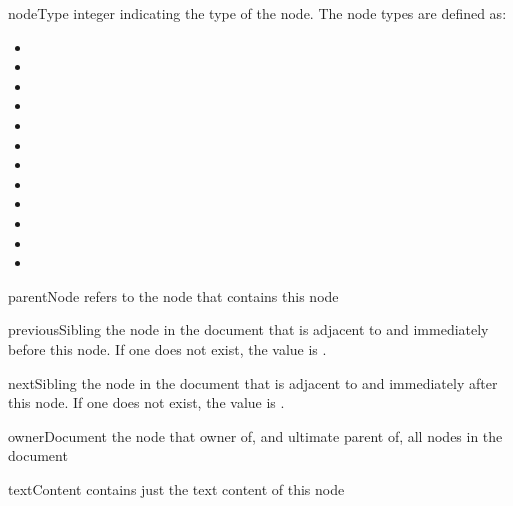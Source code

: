 \begin{memberdesc}[Node]{nodeType}
integer indicating the type of the node.  The node types are defined as:
\begin{itemize}
\item {}
\item {}
\item {}
\item {}
\item {}
\item {}
\item {}
\item {}
\item {}
\item {}
\item {}
\item {}
\end{itemize}
\end{memberdesc}

\begin{memberdesc}[Node]{parentNode}
refers to the node that contains this node
\end{memberdesc}

\begin{memberdesc}[Node]{previousSibling}
the node in the document that is adjacent to and immediately before this 
node.  If one does not exist, the value is .
\end{memberdesc}

\begin{memberdesc}[Node]{nextSibling}
the node in the document that is adjacent to and immediately after this 
node.  If one does not exist, the value is .
\end{memberdesc}

\begin{memberdesc}[Node]{ownerDocument}
the node that owner of, and ultimate parent of, all nodes in the document
\end{memberdesc}

\begin{memberdesc}[Node]{textContent}
contains just the text content of this node
\end{memberdesc}


